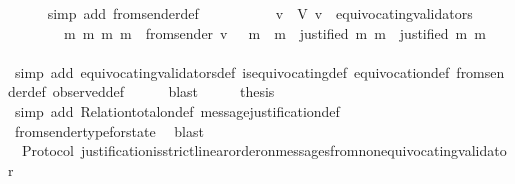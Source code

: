 \begin{isabellebody}
\ \ \ \ \isamarkupfalse%
\ {\isacharparenleft}simp\ add{\isacharcolon}\ from{\isacharunderscore}sender{\isacharunderscore}def{\isacharparenright}\isanewline
\ \ \isamarkupfalse%
\ \isamarkupfalse%
\ {\isachardoublequoteopen}{\isasymforall}\ {\isasymsigma}\ {\isasymin}\ {\isasymSigma}{\isachardot}\ {\isacharparenleft}{\isasymforall}\ v\ {\isasymin}\ V{\isachardot}\ v\ {\isasymnotin}\ equivocating{\isacharunderscore}validators\ {\isasymsigma}\ \isanewline
\ \ \ \ \ \ {\isasymlongrightarrow}\ {\isacharparenleft}{\isasymforall}\ m{}\ m{}{\isachardot}\ {\isacharbraceleft}m{}{\isacharcomma}\ m{}{\isacharbraceright}\ {\isasymsubseteq}\ from{\isacharunderscore}sender\ {\isacharparenleft}v{\isacharcomma}\ {\isasymsigma}{\isacharparenright}\ {\isasymlongrightarrow}\ m{}\ {\isacharequal}\ m{}\ {\isasymor}\ justified\ m{}\ m{}\ {\isasymor}\ justified\ m{}\ m{}{\isacharparenright}{\isacharparenright}{\isachardoublequoteclose}\ \isanewline
\ \ \ \ \isamarkupfalse%
\ {\isacharparenleft}simp\ add{\isacharcolon}\ equivocating{\isacharunderscore}validators{\isacharunderscore}def\ is{\isacharunderscore}equivocating{\isacharunderscore}def\ equivocation{\isacharunderscore}def\ from{\isacharunderscore}sender{\isacharunderscore}def\ observed{\isacharunderscore}def{\isacharparenright}\isanewline
\ \ \ \ \isamarkupfalse%
\ blast\isanewline
\ \ \isamarkupfalse%
\ \isamarkupfalse%
\ {\isacharquery}thesis\isanewline
\ \ \ \ \isamarkupfalse%
\ {\isacharparenleft}simp\ add{\isacharcolon}\ Relation{\isachardot}total{\isacharunderscore}on{\isacharunderscore}def\ message{\isacharunderscore}justification{\isacharunderscore}def{\isacharparenright}\isanewline
\ \ \ \ \isamarkupfalse%
\ from{\isacharunderscore}sender{\isacharunderscore}type{\isacharunderscore}for{\isacharunderscore}state\ \isamarkupfalse%
\ blast\isanewline
{}\isamarkupfalse%
%
\endisatagproof
{\isafoldproof}%
%
\isadelimproof
\isanewline
%
\endisadelimproof
\isanewline
{}\isamarkupfalse%
\ {\isacharparenleft}\ Protocol{\isacharparenright}\ justification{\isacharunderscore}is{\isacharunderscore}strict{\isacharunderscore}linear{\isacharunderscore}order{\isacharunderscore}on{\isacharunderscore}messages{\isacharunderscore}from{\isacharunderscore}non{\isacharunderscore}equivocating{\isacharunderscore}validator{\isacharcolon}\isanewline

\end{isabellebody}
